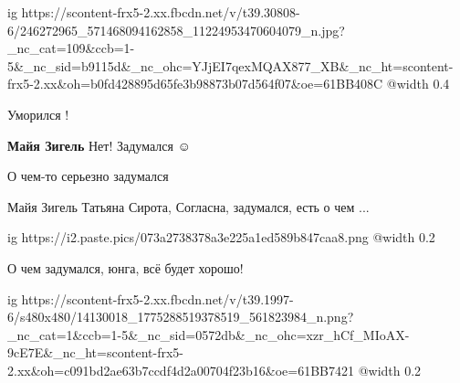  
 
 
 
 

\ifcmt
  ig https://scontent-frx5-2.xx.fbcdn.net/v/t39.30808-6/246272965_571468094162858_11224953470604079_n.jpg?_nc_cat=109&ccb=1-5&_nc_sid=b9115d&_nc_ohc=YJjEI7qexMQAX877_XB&_nc_ht=scontent-frx5-2.xx&oh=b0fd428895d65fe3b98873b07d564f07&oe=61BB408C
  @width 0.4
\fi


Уморился !

\textbf{Майя Зигель} Нет! Задумался ☺ ️ 

О чем-то серьезно задумался

Майя Зигель Татьяна Сирота, Согласна, задумался, есть о чем ...


\ifcmt
  ig https://i2.paste.pics/073a2738378a3e225a1ed589b847caa8.png
  @width 0.2
\fi

О чем задумался, юнга, всё будет хорошо!


\ifcmt
  ig https://scontent-frx5-2.xx.fbcdn.net/v/t39.1997-6/s480x480/14130018_1775288519378519_561823984_n.png?_nc_cat=1&ccb=1-5&_nc_sid=0572db&_nc_ohc=xzr_hCf_MIoAX-9cE7E&_nc_ht=scontent-frx5-2.xx&oh=c091bd2ae63b7ccdf4d2a00704f23b16&oe=61BB7421
  @width 0.2
\fi


